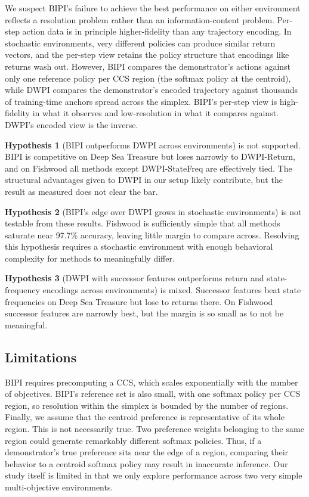 \documentclass[11pt]{article}
\begin{document}
We suspect BIPI's failure to achieve the best performance on either environment reflects a resolution problem rather than an information-content problem. Per-step action data is in principle higher-fidelity than any trajectory encoding. In stochastic environments, very different policies can produce similar return vectors, and the per-step view retains the policy structure that encodings like returns wash out. However, BIPI compares the demonstrator's actions against only one reference policy per CCS region (the softmax policy at the centroid), while DWPI compares the demonstrator's encoded trajectory against thousands of training-time anchors spread across the simplex. BIPI's per-step view is high-fidelity in what it observes and low-resolution in what it compares against. DWPI's encoded view is the inverse.

\textbf{Hypothesis 1} (BIPI outperforms DWPI across environments) is not supported. BIPI is competitive on Deep Sea Treasure but loses narrowly to DWPI-Return, and on Fishwood all methods except DWPI-StateFreq are effectively tied. The structural advantages given to DWPI in our setup likely contribute, but the result as measured does not clear the bar.

\textbf{Hypothesis 2} (BIPI's edge over DWPI grows in stochastic environments) is not testable from these results. Fishwood is sufficiently simple that all methods saturate near 97.7\% accuracy, leaving little margin to compare across. Resolving this hypothesis requires a stochastic environment with enough behavioral complexity for methods to meaningfully differ.

\textbf{Hypothesis 3} (DWPI with successor features outperforms return and state-frequency encodings across environments) is mixed. Successor features beat state frequencies on Deep Sea Treasure but lose to returns there. On Fishwood successor features are narrowly best, but the margin is so small as to not be meaningful.

\subsection*{Limitations}

BIPI requires precomputing a CCS, which scales exponentially with the number of objectives. BIPI's reference set is also small, with one softmax policy per CCS region, so resolution within the simplex is bounded by the number of regions. Finally, we assume that the centroid preference is representative of its whole region. This is not necessarily true. Two preference weights belonging to the same region could generate remarkably different softmax policies. Thus, if a demonstrator's true preference sits near the edge of a region, comparing their behavior to a centroid softmax policy may result in inaccurate inference. Our study itself is limited in that we only explore performance across two very simple multi-objective environments.
\end{document}
